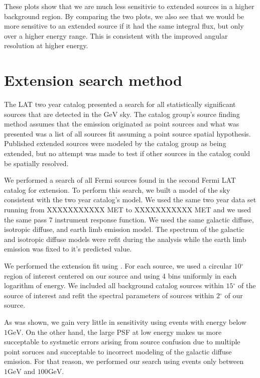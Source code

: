 \documentclass[preprint]{aastex}
\newcommand{\gev}{\text{GeV}\xspace}
\renewcommand{\deg}{\ensuremath{^\circ}\xspace}
\newcommand{\pointlike}{\text{\em pointlike}\xspace}
\begin{document}
These plots show that we are much less sensitivie to extended sources in
a higher background region. By comparing the two plots, we also see that
we would be more sensitive to an extended source if it had the same
integral flux, but only over a higher energy range. This is 
consistent with the improved angular resolution at higher energy.

\section{Extension search method}

The LAT two year catalog presented a search for all
statistically significant sources that are detected in the $\gev$
sky\cite{2fgl}.  The catalog group's source finding method assumes
that the emission originated as point sources and what was presented was
a list of all sources fit assuming a point source spatial hypothesis. 
Published extended sources were modeled by the catalog group as 
being extended, but no attempt was made to test if other sources in the catalog
could be spatially resolved.

We performed a search of all Fermi sources found in the second Fermi LAT
catalog for extension.  To perform this search, we built a model of the
sky consistent with the two year catalog's model.   We used the same two
year data set running from XXXXXXXXXXX MET to XXXXXXXXXXX MET and we used
the same pass 7 instrument response function.  We used the same galactic
diffuse, isotropic diffuse, and earth limb emission model. The spectrum of
the galactic and isotropic diffuse models were refit during the analysis
while the earth limb emission was fixed to it's predicted value.

We performed the extension fit using \pointlike.  For each source, we
used a circular $10\deg$ region of interest centered on our source and
using 4 bins uniformly in each logarithm of energy.  We included all
background catalog sources within $15\deg$ of the source of interest
and refit the spectral parameters of sources within $2\deg$ of our source.

As was shown, we gain very little in sensitivity using events with energy
below $1\gev$. On the other hand, the large PSF at low energy makes us
more succeptable to systmetic errors arising from source confusion due
to multiple point soruces and succeptable to incorrect modeling of the
galactic diffuse emission.  For that reason, we performed our search
using events only between $1\gev$ and $100\gev$.
\end{document}
